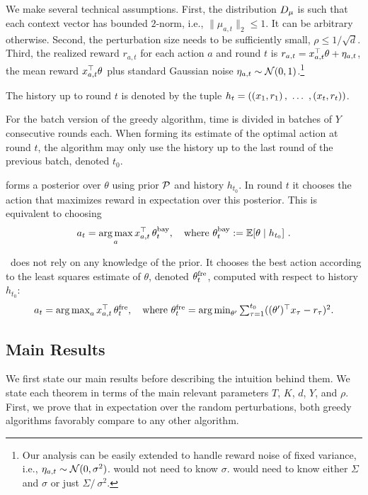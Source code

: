 We make several technical assumptions. First, the distribution $D_\mu$ is such that each context vector has bounded $2$-norm, i.e., $\|\mu_{a,t}\|_2 \le 1$. It can be arbitrary otherwise. Second, the perturbation size needs to be sufficiently small,  $\rho\leq 1/\sqrt{d}$.
Third, the realized reward $r_{a,t}$ for each action $a$ and round $t$ is
    $r_{a,t} = x_{a,t}^{\top} \theta + \eta_{a,t}$,
the mean reward $x_{a,t}^{\top} \theta$ plus standard Gaussian noise $\eta_{a,t}\sim \mathcal{N}(0, 1)$.\footnote{Our analysis can be easily extended to handle reward noise of fixed variance, i.e.,
    $\eta_{a,t}\sim \mathcal{N}(0, \sigma^2)$.
\fg would not need to know $\sigma$. \bg would need to know either $\Sigma$ and $\sigma$ or just $\Sigma/\ \sigma^2$.}

The history up to round $t$ is denoted by the tuple $h_t = ((x_{1}, r_1) \, ,\ \ldots\ , (x_t, r_t))$.

For the batch version of the greedy algorithm, time is divided in batches of $Y$ consecutive rounds each. When forming its estimate of the optimal action at round $t$, the algorithm may only use the history up to the last round of the previous batch, denoted $t_0$.

\bg forms a posterior over $\theta$ using prior $\mathcal{P}$ and history $h_{t_0}$.  In round $t$ it chooses the action that maximizes reward in expectation over this posterior. This is equivalent to choosing
\begin{align}\label{eq:BG-est-defn}
 a_t = \operatorname*{arg\,max}_a  x_{a,t}^{\top} \, \theta_t^{\textrm{bay}}, \quad
    \text{where $\theta_t^{\textrm{bay}} := \operatorname{\mathbb{E}}[\theta \mid h_{t_0}] $ }.
\end{align}

\fg~does not rely on any knowledge of the prior. It chooses the best action according to the least squares estimate of $\theta$, denoted $\theta_{t}^{\textrm{fre}}$, computed with respect to history $h_{t_0}$:
\begin{align}\label{eq:FG-est-defn}
 \textstyle a_t = \operatorname*{arg\,max}_a  x_{a, t}^{\top} \, \theta_{t}^{\textrm{fre}}, \quad
\text{where $\theta_{t}^{\textrm{fre}} = \operatorname*{arg\,min}_{\theta'} \sum_{\tau = 1}^{t_0} ((\theta') ^{\top}
x_{\tau} - r_{\tau})^2$}.
\end{align}

\subsection{Main Results}

We first state our main results before describing the intuition behind them. We  state  each theorem  in terms of the main relevant parameters $T$, $K$, $d$, $Y$, and $\rho$.
First, we prove that in expectation over the random perturbations, both greedy algorithms favorably compare to any other algorithm.

